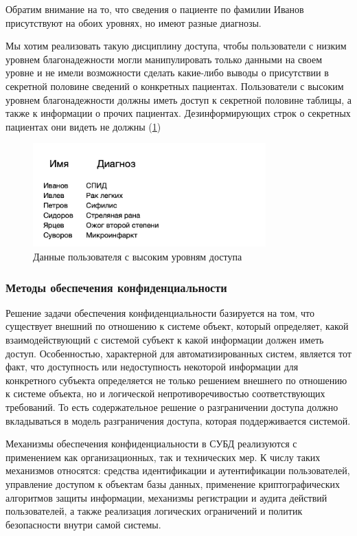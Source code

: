 Обратим внимание на то, что сведения о пациенте по фамилии Иванов присутствуют на обоих уровнях,
но имеют разные диагнозы.

Мы хотим реализовать такую дисциплину доступа, чтобы пользователи с низким уровнем благонадежности
могли манипулировать только данными на своем уровне и не имели возможности сделать какие-либо
выводы о присутствии в секретной половине сведений о конкретных пациентах. Пользователи с высоким
уровнем благонадежности должны иметь доступ к секретной половине таблицы, а также к информации о
прочих пациентах. Дезинформирующих строк о секретных пациентах они видеть не должны (\ref{fig:NSD-3})

\begin{figure}[h]
    \centering
    \includegraphics[width=0.8\textwidth]{assets/diagnoses3.png}
    \caption{Данные пользователя с высоким уровням доступа}
    \label{fig:NSD-3}
\end{figure}

\subsubsection{Методы обеспечения конфиденциальности}

Решение задачи обеспечения конфиденциальности базируется на том, что существует внешний по отношению к системе объект, который определяет, какой взаимодействующий с системой субъект к какой информации должен иметь доступ. Особенностью, характерной для автоматизированных систем, является тот факт, что доступность или недоступность некоторой информации для конкретного субъекта определяется не только решением внешнего по отношению к системе объекта, но и логической непротиворечивостью соответствующих требований. То есть содержательное решение о разграничении доступа должно вкладываться в модель разграничения доступа, которая поддерживается системой.\cite{Smirnov2007}

Механизмы обеспечения конфиденциальности в СУБД реализуются с применением как организационных, так и технических мер. К числу таких механизмов относятся: средства идентификации и аутентификации пользователей, управление доступом к объектам базы данных, применение криптографических алгоритмов защиты информации, механизмы регистрации и аудита действий пользователей, а также реализация логических ограничений и политик безопасности внутри самой системы.\cite{Smirnov2007}

